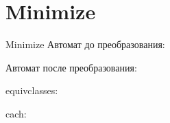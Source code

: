 \section{Minimize}
\begin{frame}{Minimize}
	Автомат до преобразования:


	Автомат после преобразования:


	equivclasses:


	cach:


\end{frame}
